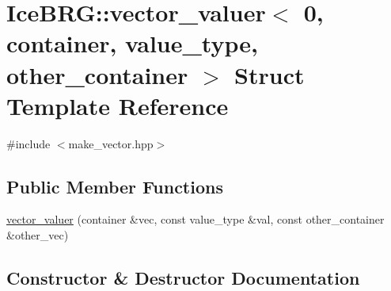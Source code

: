 \hypertarget{structIceBRG_1_1vector__valuer_3_010_00_01container_00_01value__type_00_01other__container_01_4}{}\section{Ice\+B\+R\+G\+:\+:vector\+\_\+valuer$<$ 0, container, value\+\_\+type, other\+\_\+container $>$ Struct Template Reference}
\label{structIceBRG_1_1vector__valuer_3_010_00_01container_00_01value__type_00_01other__container_01_4}


{\ttfamily \#include $<$make\+\_\+vector.\+hpp$>$}

\subsection*{Public Member Functions}
\begin{DoxyCompactItemize}
\item 
\hyperlink{structIceBRG_1_1vector__valuer_3_010_00_01container_00_01value__type_00_01other__container_01_4_a429dc9a88e351027d15bea4a64e74131}{vector\+\_\+valuer} (container \&vec, const value\+\_\+type \&val, const other\+\_\+container \&other\+\_\+vec)
\end{DoxyCompactItemize}


\subsection{Constructor \& Destructor Documentation}
\hypertarget{structIceBRG_1_1vector__valuer_3_010_00_01container_00_01value__type_00_01other__container_01_4_a429dc9a88e351027d15bea4a64e74131}{}
